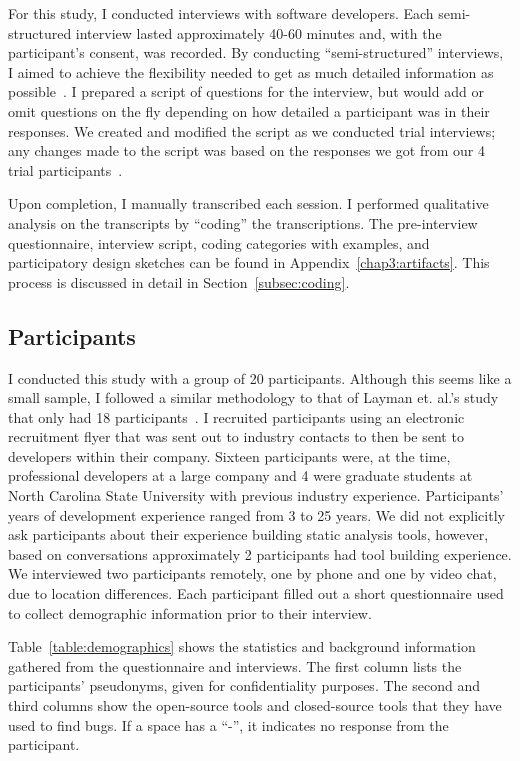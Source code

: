 For this study, I conducted interviews with software developers. Each
semi-structured interview lasted approximately 40-60 minutes and, with the
participant's consent, was recorded. By conducting ``semi-structured''
interviews, I aimed to achieve the flexibility needed to get as much detailed
information as possible~\cite{Hove:2005:Interview}. I prepared a script of
questions for the interview, but would add or omit questions on the fly
depending on how detailed a participant was in their responses.
We created and modified the script as we conducted trial interviews; any changes
made to the script was based on the responses we got from our 4 trial
participants~\cite{Johnson:2012:PreFFSAT}.


Upon completion, I manually transcribed each session. I
performed qualitative analysis on the transcripts by
``coding'' the transcriptions. 
The pre-interview questionnaire, interview script, coding categories with examples, and participatory design sketches can be found in Appendix~\ref{chap3:artifacts}.
This process is discussed in detail in
Section~\ref{subsec:coding}.

\subsection{Participants}
\label{subsec:participants}

I conducted this study with a group of 20 participants. Although this seems
like a small sample, I followed a similar methodology to that of Layman et.
al.'s study that only had 18 participants~\cite{Layman:2007:FaultFix}.
I recruited participants using an electronic recruitment flyer that was sent
out to industry contacts to then be sent to developers within their company.
Sixteen participants were, at the time, professional developers at a large company and 4
were graduate students at North Carolina State University with previous industry
experience. Participants' years of development experience ranged from 3 to 25
years. We did not explicitly ask participants about their experience building
static analysis tools, however, based on conversations approximately 2
participants had tool building experience. We interviewed two participants
remotely, one by phone and one by video chat, due to location differences. Each
participant filled out a short questionnaire used to collect demographic
information prior to their interview.

Table~\ref{table:demographics} shows the statistics and background information
gathered from the questionnaire and interviews. The first column lists the
participants' pseudonyms, given for confidentiality purposes. The second and
third columns show the open-source tools and closed-source tools that they have
used to find bugs. If a space has a ``-'', it indicates no response from the
participant.  


